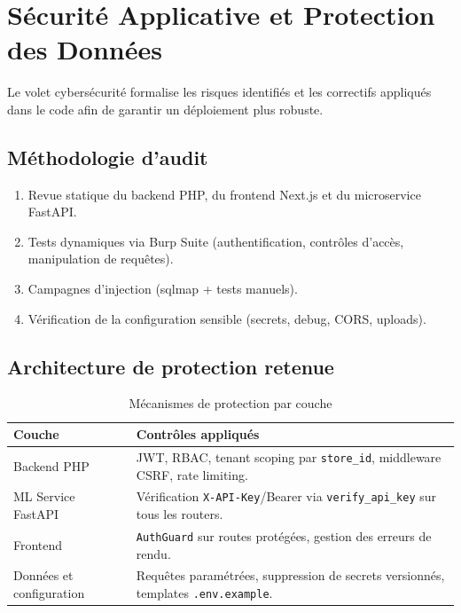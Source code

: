 \documentclass[12pt,a4paper]{report}
\begin{document}
\chapter{S\'{e}curit\'{e} Applicative et Protection des Donn\'{e}es}

Le volet cybers\'{e}curit\'{e} formalise les risques identifi\'{e}s et les correctifs appliqu\'{e}s dans le code afin de garantir un d\'{e}ploiement plus robuste.

\section{M\'{e}thodologie d'audit}

\begin{enumerate}
  \item Revue statique du backend PHP, du frontend Next.js et du microservice FastAPI.
  \item Tests dynamiques via Burp Suite (authentification, contr\^{o}les d'acc\`{e}s, manipulation de requ\^{e}tes).
  \item Campagnes d'injection (sqlmap + tests manuels).
  \item V\'{e}rification de la configuration sensible (secrets, debug, CORS, uploads).
\end{enumerate}

\section{Architecture de protection retenue}

\begin{table}[H]
\centering
\caption{M\'{e}canismes de protection par couche}
\label{tab:security_layers_compact}
\begin{tabularx}{\textwidth}{l X}
\toprule
\textbf{Couche} & \textbf{Contr\^{o}les appliqu\'{e}s} \\
\midrule
Backend PHP & JWT, RBAC, tenant scoping par \texttt{store\_id}, middleware CSRF, rate limiting. \\
ML Service FastAPI & V\'{e}rification \texttt{X-API-Key}/Bearer via \texttt{verify\_api\_key} sur tous les routers. \\
Frontend & \texttt{AuthGuard} sur routes prot\'{e}g\'{e}es, gestion des erreurs de rendu. \\
Donn\'{e}es et configuration & Requ\^{e}tes param\'{e}tr\'{e}es, suppression de secrets versionn\'{e}s, templates \texttt{.env.example}. \\
\bottomrule
\end{tabularx}
\end{table}
\end{document}
